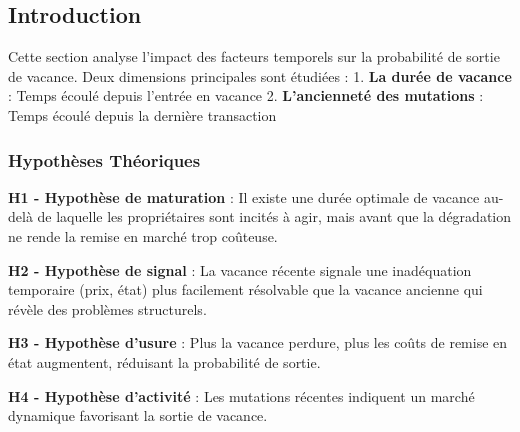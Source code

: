 \documentclass[11pt]{article}
\begin{document}
\subsection{Introduction}\label{introduction}

Cette section analyse l'impact des facteurs temporels sur la probabilité
de sortie de vacance. Deux dimensions principales sont étudiées : 1.
\textbf{La durée de vacance} : Temps écoulé depuis l'entrée en vacance
2. \textbf{L'ancienneté des mutations} : Temps écoulé depuis la dernière
transaction

\subsubsection{Hypothèses Théoriques}\label{hypothuxe8ses-thuxe9oriques}

\textbf{H1 - Hypothèse de maturation} : Il existe une durée optimale de
vacance au-delà de laquelle les propriétaires sont incités à agir, mais
avant que la dégradation ne rende la remise en marché trop coûteuse.

\textbf{H2 - Hypothèse de signal} : La vacance récente signale une
inadéquation temporaire (prix, état) plus facilement résolvable que la
vacance ancienne qui révèle des problèmes structurels.

\textbf{H3 - Hypothèse d'usure} : Plus la vacance perdure, plus les
coûts de remise en état augmentent, réduisant la probabilité de sortie.

\textbf{H4 - Hypothèse d'activité} : Les mutations récentes indiquent un
marché dynamique favorisant la sortie de vacance.
\end{document}
